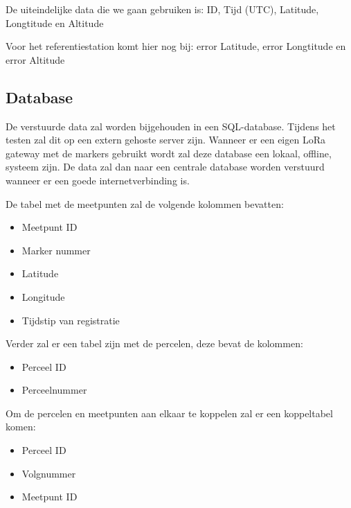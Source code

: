 De uiteindelijke data die we gaan gebruiken is:
ID, Tijd (UTC), Latitude, Longtitude en Altitude

Voor het referentiestation komt hier nog bij:
error Latitude, error Longtitude en error Altitude

\subsection{Database}
\label{sec:database}

De verstuurde data zal worden bijgehouden in een SQL-database. Tijdens het testen
zal dit op een extern gehoste server zijn.
Wanneer er een eigen LoRa gateway met de markers gebruikt wordt zal deze database
een lokaal, offline, systeem zijn. De data zal dan naar een centrale database
worden verstuurd wanneer er een goede internetverbinding is.

De tabel met de meetpunten zal de volgende kolommen bevatten:
\begin{itemize}
    \item Meetpunt ID
    \item Marker nummer
    \item Latitude
    \item Longitude
    \item Tijdstip van registratie
\end{itemize}

Verder zal er een tabel zijn met de percelen, deze bevat de kolommen:
\begin{itemize}
    \item Perceel ID
    \item Perceelnummer
\end{itemize}

Om de percelen en meetpunten aan elkaar te koppelen zal er een koppeltabel komen:
\begin{itemize}
    \item Perceel ID
    \item Volgnummer
    \item Meetpunt ID
\end{itemize}
